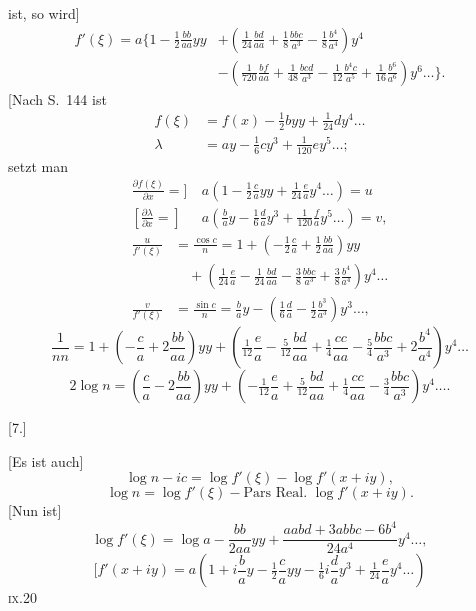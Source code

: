 \noindent ist, so wird]
\[
\begin{aligned}
f'(\xi)=a\biggl\{1-\tfrac12\frac{bb}{aa}yy
 &+\left(\tfrac1{24}\frac{bd}{aa}+\tfrac18\frac{bbc}{a^3}-\tfrac18\frac{b^4}{a^4}\right)y^4\\
 &-\left(\tfrac1{720}\frac{bf}{aa}+\tfrac1{48}\frac{bcd}{a^3}
 -\tfrac1{12}\frac{b^4c}{a^5}+\tfrac1{16}\frac{b^6}{a^6}\right)y^6\ldots\biggr\}.
\end{aligned}
\]
[Nach S.\ 144 ist
\[
\begin{aligned}
f(\xi)&=f(x)-\tfrac12byy+\tfrac1{24}dy^4\ldots\\
\lambda&=ay-\tfrac16cy^3+\tfrac1{120}ey^5\ldots;
\end{aligned}
\]
\noindent setzt man
\[
\begin{aligned}
\frac{\partial f(\xi)}{\partial x}={]}&\ a\left(1-\tfrac12\frac ca yy+\tfrac1{24}\frac ea y^4\ldots\right)=u\\
\left[\frac{\partial\lambda}{\partial x}={}\right]&\ a\left(\frac ba y-\tfrac16\frac da y^3+\tfrac1{120}\frac fa y^5\ldots\right)=v,
\end{aligned}
\]
\noindent [so ist]
\[
\begin{aligned}
\frac{u}{f'(\xi)}&=\frac{\cos c}{n}=1+\left(-\tfrac12\frac ca+\tfrac12\frac{bb}{aa}\right)yy\\
 &\quad+\left(\tfrac1{24}\frac ea-\tfrac1{24}\frac{bd}{aa}-\tfrac38\frac{bbc}{a^3}
 +\tfrac38\frac{b^4}{a^4}\right)y^4\ldots\\
\frac{v}{f'(\xi)}&=\frac{\sin c}{n}=\frac ba y
-\left(\tfrac16\frac da-\tfrac12\frac{b^3}{a^3}\right)y^3\ldots,
\end{aligned}
\]
\[
\frac1{nn}=1+\left(-\frac ca+2\frac{bb}{aa}\right)yy
+\left(\tfrac1{12}\frac ea-\tfrac5{12}\frac{bd}{aa}+\tfrac14\frac{cc}{aa}
-\tfrac54\frac{bbc}{a^3}+2\frac{b^4}{a^4}\right)y^4\ldots
\]
\noindent [und]
\[
2\log n=\left(\frac ca-2\frac{bb}{aa}\right)yy
+\left(-\tfrac1{12}\frac ea+\tfrac5{12}\frac{bd}{aa}+\tfrac14\frac{cc}{aa}
-\tfrac34\frac{bbc}{a^3}\right)y^4\ldots.
\]

\begin{center}[7.]\end{center}
[Es ist auch]
\[
\log n-ic=\log f'(\xi)-\log f'(x+iy),
\]
\noindent [mithin]
\[
\log n=\log f'(\xi)-\text{Pars Real. }\log f'(x+iy).
\]
[Nun ist]
\[
\log f'(\xi)=\log a-\frac{bb}{2aa}yy+\frac{aabd+3abbc-6b^4}{24a^4}y^4\ldots,
\]
\[
[f'(x+iy)=a\left(1+i\frac ba y-\tfrac12\frac ca yy-\tfrac16i\frac da y^3
+\tfrac1{24}\frac ea y^4\ldots\right)
\]
\noindent\textsc{ix.}\hfill 20\hspace*{.12\linewidth}\par

